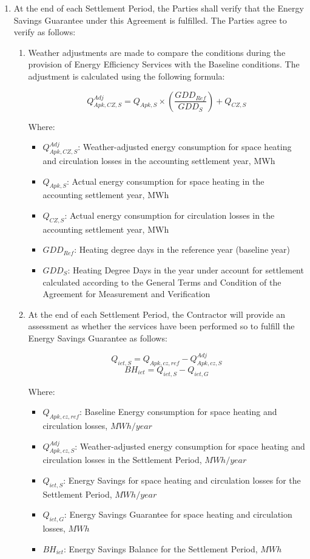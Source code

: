 \begin{enumerate}
	\item At the end of each Settlement Period, the Parties shall verify that the Energy Savings Guarantee under this Agreement is fulfilled. The Parties agree to verify as follows:
	\begin{enumerate}
		\item Weather adjustments are made to compare the conditions during the provision of Energy Efficiency Services with the Baseline conditions. The adjustment is calculated using the following formula:

\[ Q^{Adj}_{Apk,CZ,S} = Q_{Apk,S} \times \left( \frac{GDD_{Ref}}{GDD_S}\right) + Q_{CZ,S} \]

Where:

\begin{itemize}
	\item $Q^{Adj}_{Apk,CZ,S}$: Weather-adjusted energy consumption for space heating and circulation losses in the accounting settlement year, MWh
	\item $Q_{Apk,S}$: Actual energy consumption for space heating in the accounting settlement year, MWh
	\item $Q_{CZ,S}$: Actual energy consumption for circulation losses in the accounting settlement year, MWh
	\item $GDD_{Ref}$: Heating degree days in the reference year (baseline year)
	\item $GDD_S$: Heating Degree Days in the year under account for settlement calculated according to the General Terms and Condition of the Agreement for Measurement and Verification
\end{itemize}

		\item At the end of each Settlement Period, the Contractor will provide an assessment as whether the services have been performed so to fulfill the Energy Savings Guarantee as follows:

\[ Q_{iet,S} = Q_{Apk,cz,ref} - Q^{Adj}_{Apk,cz,S} \]
\[ BH_{iet} = Q_{iet,S} - Q_{iet,G} \]

Where:

\begin{itemize}
\item $Q_{Apk,cz,ref}$: Baseline Energy consumption for space heating and circulation losses, $MWh/year$
\item $Q^{Adj}_{Apk,cz,S}$: Weather-adjusted energy consumption for space heating and circulation losses in the Settlement Period, $MWh/year$
\item $Q_{iet,S}$: Energy Savings for space heating and circulation losses for the Settlement Period, $MWh/year$
\item $Q_{iet,G}$: Energy Savings Guarantee for space heating and circulation losses, $MWh$
\item $BH_{iet}$: Energy Savings Balance for the Settlement Period, $MWh$
\end{itemize}


\end{enumerate}
\end{enumerate}
